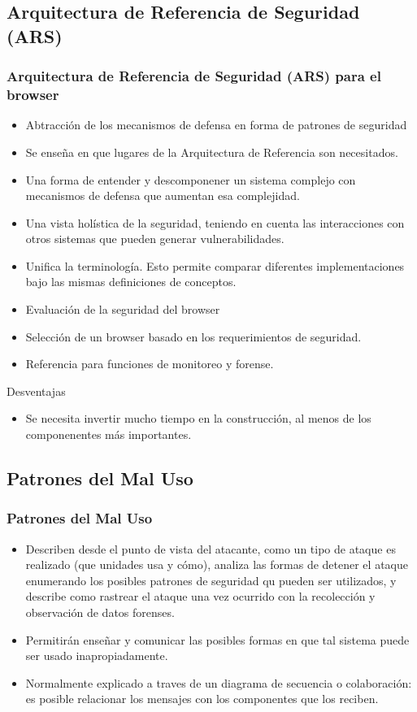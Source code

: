 \documentclass[serif,9pt]{beamer}
\begin{document}
\subsection{Arquitectura de Referencia de Seguridad (ARS)}
\begin{frame}
	\frametitle{Arquitectura de Referencia de Seguridad (ARS) para el browser}
	\begin{itemize}
		\item Abtracción de los mecanismos de defensa en forma de patrones de seguridad
		\item Se enseña en que lugares de la Arquitectura de Referencia son necesitados.
		\item Una forma de entender y descomponener un sistema complejo con mecanismos de defensa que aumentan esa complejidad.
		\item Una vista holística de la seguridad, teniendo en cuenta las interacciones con otros sistemas que pueden generar vulnerabilidades.
		\item Unifica la terminología. Esto permite comparar diferentes implementaciones bajo las mismas definiciones de conceptos.
		\item Evaluación de la seguridad del browser
		\item Selección de un browser basado en los requerimientos de seguridad.
		\item Referencia para funciones de monitoreo y forense.
	\end{itemize}
	\begin{block}{Desventajas}
		\begin{itemize}
			\item Se necesita invertir mucho tiempo en la construcción, al menos de los componenentes más importantes.
		\end{itemize}
	\end{block}
\end{frame}

\subsection{Patrones del Mal Uso}
\begin{frame}
	\frametitle{Patrones del Mal Uso}
	\begin{itemize}
		\item Describen desde el punto de vista del atacante, como un tipo de ataque es realizado (que unidades usa y cómo), analiza las formas de detener el ataque enumerando los posibles patrones de seguridad qu pueden ser utilizados, y describe como rastrear el ataque una vez ocurrido con la recolección y observación de datos forenses.
		\item Permitir\'an enseñar y comunicar las posibles formas en que tal sistema puede ser usado inapropiadamente.
		\item Normalmente explicado a traves de un diagrama de secuencia o colaboración: es posible relacionar los mensajes con los componentes que los reciben.
	\end{itemize}
\end{frame}
\end{document}
